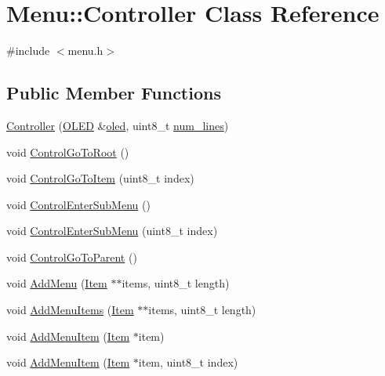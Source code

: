 \hypertarget{class_menu_1_1_controller}{\section{Menu\-:\-:Controller Class Reference}
\label{class_menu_1_1_controller}
}


{\ttfamily \#include $<$menu.\-h$>$}

\subsection*{Public Member Functions}
\begin{DoxyCompactItemize}
\item 
\hyperlink{class_menu_1_1_controller_afcbda47e43a9753875631f0d4106f604}{Controller} (\hyperlink{class_o_l_e_d}{O\-L\-E\-D} \&\hyperlink{class_menu_1_1_controller_aaa0388123d9e3bb0d4f546336e2b502d}{oled}, uint8\-\_\-t \hyperlink{class_menu_1_1_controller_a80d614a66d1ffa2612688776842f1f31}{num\-\_\-lines})
\item 
void \hyperlink{class_menu_1_1_controller_a4d270009fff9dfc6baa4433f219626c4}{Control\-Go\-To\-Root} ()
\item 
void \hyperlink{class_menu_1_1_controller_a0dae623388e9bb9e651385d0ef9a2394}{Control\-Go\-To\-Item} (uint8\-\_\-t index)
\item 
void \hyperlink{class_menu_1_1_controller_a9a4c0ccd822f485834ec9abb4133a059}{Control\-Enter\-Sub\-Menu} ()
\item 
void \hyperlink{class_menu_1_1_controller_a8bc1d62574e86a08d5a60652370dd21a}{Control\-Enter\-Sub\-Menu} (uint8\-\_\-t index)
\item 
void \hyperlink{class_menu_1_1_controller_ad4bcb0925c933dce2cceacdbd1b26294}{Control\-Go\-To\-Parent} ()
\item 
void \hyperlink{class_menu_1_1_controller_ab530ec11f04b96254b93961d26152d3c}{Add\-Menu} (\hyperlink{struct_menu_1_1_item}{Item} $\ast$$\ast$items, uint8\-\_\-t length)
\item 
void \hyperlink{class_menu_1_1_controller_ad28e732923bf111fd26a7ea031885f70}{Add\-Menu\-Items} (\hyperlink{struct_menu_1_1_item}{Item} $\ast$$\ast$items, uint8\-\_\-t length)
\item 
void \hyperlink{class_menu_1_1_controller_a777d65ba4f168aed6c1c44022ca4c658}{Add\-Menu\-Item} (\hyperlink{struct_menu_1_1_item}{Item} $\ast$item)
\item 
void \hyperlink{class_menu_1_1_controller_a9e5366f182975680e88749f03d249a0a}{Add\-Menu\-Item} (\hyperlink{struct_menu_1_1_item}{Item} $\ast$item, uint8\-\_\-t index)

\end{DoxyCompactItemize}
